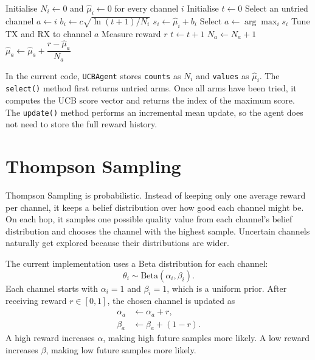 \documentclass[11pt,a4paper]{article}
\begin{document}
\begin{algorithm}[H]
\caption{UCB Channel Selection}
\begin{algorithmic}[1]
\State Initialise $N_i \gets 0$ and $\hat{\mu}_i \gets 0$ for every channel $i$
\State Initialise $t \gets 0$
        \State Select an untried channel $a \gets i$
    \Else
            \State $b_i \gets c\sqrt{\ln(t+1)/N_i}$
            \State $s_i \gets \hat{\mu}_i + b_i$
        \EndFor
        \State Select $a \gets \arg\max_i s_i$
    \EndIf
    \State Tune TX and RX to channel $a$
    \State Measure reward $r$
    \State $t \gets t + 1$
    \State $N_a \gets N_a + 1$
    \State $\hat{\mu}_a \gets \hat{\mu}_a + \dfrac{r - \hat{\mu}_a}{N_a}$
\EndFor
\end{algorithmic}
\end{algorithm}

\begin{implbox}
In the current code, \texttt{UCBAgent} stores \texttt{counts} as $N_i$ and \texttt{values} as $\hat{\mu}_i$. The \texttt{select()} method first returns untried arms. Once all arms have been tried, it computes the UCB score vector and returns the index of the maximum score. The \texttt{update()} method performs an incremental mean update, so the agent does not need to store the full reward history.
\end{implbox}

\section{Thompson Sampling}

\begin{intuitionbox}
Thompson Sampling is probabilistic. Instead of keeping only one average reward per channel, it keeps a belief distribution over how good each channel might be. On each hop, it samples one possible quality value from each channel's belief distribution and chooses the channel with the highest sample. Uncertain channels naturally get explored because their distributions are wider.
\end{intuitionbox}

The current implementation uses a Beta distribution for each channel:
\begin{equation}
    \theta_i \sim \mathrm{Beta}(\alpha_i,\beta_i).
\end{equation}
Each channel starts with $\alpha_i=1$ and $\beta_i=1$, which is a uniform prior. After receiving reward $r\in[0,1]$, the chosen channel is updated as
\begin{align}
    \alpha_a &\gets \alpha_a + r,\\
    \beta_a  &\gets \beta_a + (1-r).
\end{align}
A high reward increases $\alpha$, making high future samples more likely. A low reward increases $\beta$, making low future samples more likely.
\end{document}
